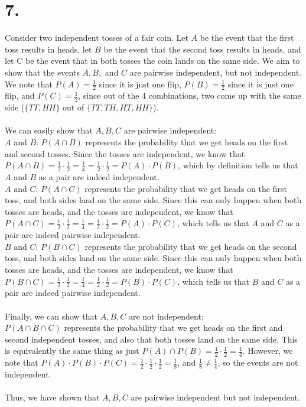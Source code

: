 \documentclass{article}
\begin{document}
\section*{7.}
{\Large 

Consider two independent tosses of a fair coin. Let $A$ be the event that the first toss results in heads, let $B$ be the event that the second toss results in heads, and let C be the event that in both tosses the coin lands on the same side. We aim to show that the events $A, B,$ and $C$ are pairwise independent, but not independent. \\ 
We note that $P(A) = \frac{1}{2}$ since it is just one flip, $P(B) = \frac{1}{2}$ since it is just one flip, and $P(C) = \frac{1}{2}$, since out of the 4 combinations, two come up with the same side ($\{TT, HH\}$ out of $\{TT, TH, HT, HH\}$). \\ \\
We can easily show that $A, B, C$ are pairwise independent: \\
$A \text{ and } B$: $P(A \cap B)$ represents the probability that we get heads on the first and second tosses. Since the tosses are independent, we know that  $P(A \cap B) = \frac{1}{2} \cdot \frac{1}{2} = \frac{1}{4} = \frac{1}{2} \cdot \frac{1}{2} = P(A) \cdot P(B)$, which by definition tells us that $A$ and $B$ as a pair are indeed independent. \\ 
$A \text{ and } C$: $P(A \cap C)$ represents the probability that we get heads on the first toss, and both sides land on the same side. Since this can only happen when both tosses are heads, and the tosses are independent, we know that $P(A \cap C) = \frac{1}{2} \cdot \frac{1}{2} = \frac{1}{4} = \frac{1}{2} \cdot \frac{1}{2} = P(A) \cdot P(C)$, which tells us that $A$ and $C$ as a pair are indeed pairwise independent.\\ 
$B \text{ and } C$: $P(B \cap C)$ represents the probability that we get heads on the second toss, and both sides land on the same side. Since this can only happen when both tosses are heads, and the tosses are independent, we know that $P(B \cap C) = \frac{1}{2} \cdot \frac{1}{2} = \frac{1}{4} = \frac{1}{2} \cdot \frac{1}{2} = P(B) \cdot P(C)$, which tells us that $B$ and $C$ as a pair are indeed pairwise independent.\\ \\
Finally, we can show that $A, B, C$ are not independent: \\
$P(A \cap B \cap C)$ represents the probability that we get heads on the first and second independent tosses, and also that both tosses land on the same side. This is equivalently the same thing as just $P(A) \cap P(B) = \frac{1}{2} \cdot \frac{1}{2} = \frac{1}{4}$. However, we note that $P(A) \cdot P(B) \cdot P(C) = \frac{1}{2} \cdot \frac{1}{2} \cdot \frac{1}{2} = \frac{1}{8}$, and $\frac{1}{8} \neq \frac{1}{4}$, so the events are not independent. \\ \\ 
Thus, we have shown that $A, B, C$ are pairwise independent but not independent.

}
\end{document}
